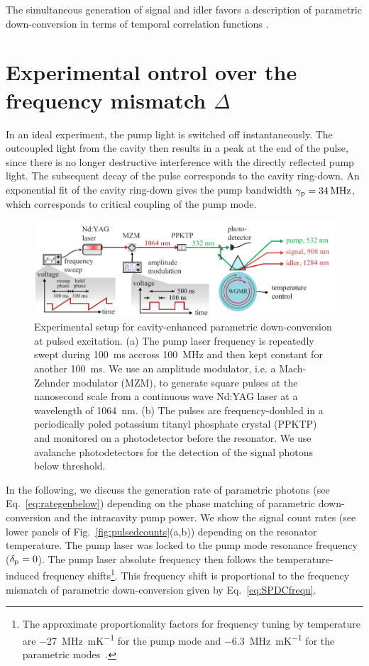 \documentclass[aps,pra,showpacs,reprint,onecolumn,notitlepage]{revtex4-1}
\newcommand{\tx}[1]{\textnormal{#1}}
\begin{document}
The simultaneous generation of signal and idler  favors a description of parametric down-conversion in terms of temporal correlation functions \cite{Fekete2013,glauber1963,Michael2013,Ou1999,Scholz2009,Bocquillon2009,Bettelli2010,Luo2015}.


\FloatBarrier
\section{Experimental ontrol over the frequency mismatch $\Delta$}
In an ideal experiment, the pump light is switched off instantaneously. The outcoupled light from the cavity then results in a peak at the end of the pulse, since there is no longer destructive interference with the directly reflected pump light. The subsequent decay of the pulse corresponds to the cavity ring-down. An exponential fit of the cavity ring-down gives the pump bandwidth $\gamma_\tx{p}=\SI{34}{\MHz}$, which corresponds to critical coupling of the pump mode. 
\begin{figure}[htb]
  \centering
  \includegraphics[scale=0.9]{pictures/exp_WGMR_detuning/WGMRsetup_pulsing4.pdf} 
\caption{Experimental setup for cavity-enhanced parametric down-conversion at pulsed excitation. (a) The pump laser frequency is repeatedly swept during \SI{100}{\ms} accross \SI{100}{\MHz} and then kept constant for another \SI{100}{\ms}. We use an amplitude modulator, i.e. a Mach-Zehnder modulator (MZM), to generate square pulses at the nanosecond scale from a continuous wave Nd:YAG laser at a wavelength of \SI{1064}{\nm}. (b) The pulses are frequency-doubled in a periodically poled potassium titanyl phosphate crystal (PPKTP) and monitored on a photodetector before the resonator. We use avalanche photodetectors for the detection of the signal photons below threshold.}
\label{fig:pulsingsetup}
\end{figure}
In the following, we discuss the generation rate of parametric photons (see Eq.~\ref{eq:rategenbelow}) depending on the phase matching of parametric down-conversion and the intracavity pump power. We show the signal count rates (see lower panels of Fig.~\ref{fig:pulsedcounts}(a,b)) depending on the resonator temperature. The pump laser was locked to the pump mode resonance frequency ($\delta_\tx{p}=0$). The pump laser absolute frequency then follows the temperature-induced frequency shifts\footnote{The approximate proportionality factors for frequency tuning by temperature are \SI{-27}{\MHz\per\milli\kelvin} for the pump mode and \SI{-6.3}{\MHz\per\milli\kelvin} for the parametric modes~\cite{Schlarb1994,Weis1985}.}. This frequency shift is proportional to the frequency mismatch of parametric down-conversion given by Eq.~\ref{eq:SPDCfrequ}. 
\end{document}
